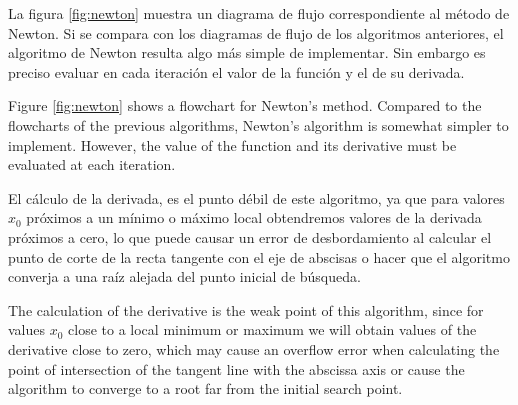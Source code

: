 \begin{paracol}{2}

La figura \ref{fig:newton} muestra un diagrama de flujo correspondiente al método de Newton. Si se compara con los diagramas de flujo de los algoritmos anteriores, el algoritmo de Newton resulta algo más simple de implementar. Sin embargo es preciso evaluar en cada iteración el valor de la función y el de su derivada. 

\switchcolumn

Figure \ref{fig:newton} shows a flowchart for Newton's method. Compared to the flowcharts of the previous algorithms, Newton's algorithm is somewhat simpler to implement. However, the value of the function and its derivative must be evaluated at each iteration. 

\switchcolumn

El cálculo de la derivada, es el punto débil de este algoritmo, ya que para valores $x_0$ próximos a un mínimo o máximo local obtendremos valores de la derivada próximos a cero, lo que puede causar un error de desbordamiento al calcular el punto de corte de la recta tangente con el eje de abscisas o hacer que el algoritmo converja a una raíz alejada del punto inicial de búsqueda.
 
\switchcolumn

The calculation of the derivative is the weak point of this algorithm, since for values $x_0$ close to a local minimum or maximum we will obtain values of the derivative close to zero, which may cause an overflow error when calculating the point of intersection of the tangent line with the abscissa axis or cause the algorithm to converge to a root far from the initial search point.

\end{paracol}

